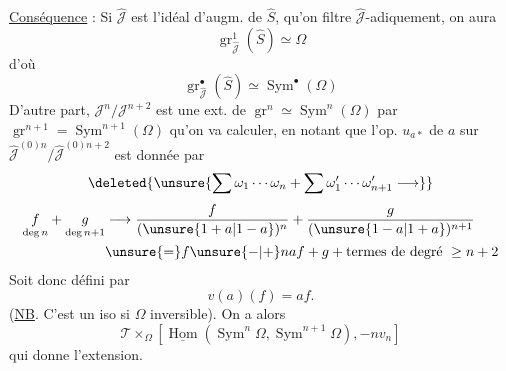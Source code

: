 \uline{Conséquence} : Si $\widehat{\mathcal{J}}$ est l'idéal d'augm. de $\widehat S$, qu'on filtre $\widehat{\mathcal{J}}$-adiquement, on aura
\[
\operatorname{gr}^1_{\widehat{\mathcal{J}}}(\widehat S)\simeq\Omega
\]
d'où
\[
\operatorname{gr}^{\bullet}_{\widehat{\mathcal{J}}}(\widehat S)\simeq\operatorname{Sym}^{\bullet}(\Omega)
\]
D'autre part, $\mathcal{J}^n/\mathcal{J}^{n+2}$ est une ext. de $\operatorname{gr}^n\simeq\operatorname{Sym}^n(\Omega)$ par $\operatorname{gr}^{n+1}=\operatorname{Sym}^{n+1}(\Omega)$ qu'on va calculer, en notant que l'op. $u_{a*}$ de $a$ sur  $\widehat{\mathcal{J}}^{(0)n}/\widehat{\mathcal{J}}^{(0)n+2}$ est donnée par
\[
\deleted{\unsure{\sum\omega_1\cdots\omega_n+\sum\omega'_1\cdots\omega'_{n+1}\longrightarrow}}
\]
\[
\begin{aligned}
\underset{\deg n}{f}+\underset{\deg n+1}{g}
&\longrightarrow\frac{f}{(\unsure{1+a|1-a})^n}+\frac{g}{(\unsure{1-a|1+a})^{n+1}}\\
&\unsure{=}f\unsure{-|+}naf+g+\text{termes de degré }\geq n+2
\end{aligned}
\]
Soit donc
défini par
\[
v(a)(f)=af.
\]
(\uline{NB}. C'est un iso si $\Omega$ inversible). On a alors
\[
\mathcal{T}\times_{\Omega}[\underline{\operatorname{Hom}}(\operatorname{Sym}^n\Omega,\operatorname{Sym}^{n+1}\Omega),-nv_n]
\]
qui donne l'extension.
